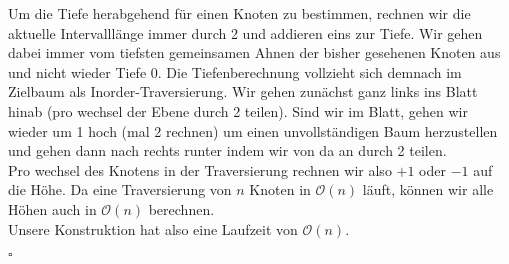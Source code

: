 \documentclass[11pt,a4paper,ngerman]{article}
\begin{document}
Um die Tiefe herabgehend für einen Knoten zu bestimmen, rechnen wir die aktuelle Intervalllänge immer durch 2 und addieren eins zur Tiefe. Wir gehen dabei immer vom tiefsten gemeinsamen Ahnen der bisher gesehenen Knoten aus und nicht wieder Tiefe $0$. Die Tiefenberechnung vollzieht sich demnach im Zielbaum als Inorder-Traversierung. Wir gehen zunächst ganz links ins Blatt hinab (pro wechsel der Ebene durch 2 teilen). Sind wir im Blatt, gehen wir wieder um 1 hoch (mal 2 rechnen) um einen unvollständigen Baum herzustellen und gehen dann nach rechts runter indem wir von da an durch 2 teilen.\\

Pro wechsel des Knotens in der Traversierung rechnen wir also $+1$ oder $-1$ auf die Höhe. Da eine Traversierung von $n$ Knoten in $\mathcal{O}(n)$ läuft, können wir alle Höhen auch in $\mathcal{O}(n)$ berechnen.\\

Unsere Konstruktion hat also eine Laufzeit von $\mathcal{O}(n)$.

\mbox{}\hfill$\square$

\label{LastPage}
\end{document}
